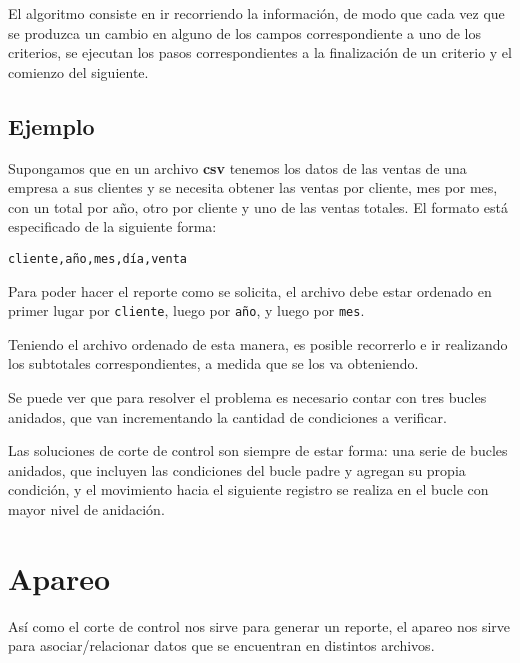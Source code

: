 El algoritmo consiste en ir recorriendo la información, de modo que cada vez
que se produzca un cambio en alguno de los campos correspondiente a uno de los
criterios, se ejecutan los pasos correspondientes a la finalización de un
criterio y el comienzo del siguiente.

\subsection*{Ejemplo}

Supongamos que en un archivo \textbf{csv} tenemos los datos de las ventas de
una empresa a sus clientes y se necesita obtener las ventas por cliente,
mes por mes, con un total por año, otro por cliente y uno de las ventas 
totales. El formato está especificado de la siguiente forma:

\begin{verbatim}
cliente,año,mes,día,venta
\end{verbatim}

Para poder hacer el reporte como se solicita, el archivo debe estar ordenado en
primer lugar por \verb!cliente!, luego por \verb!año!, y luego por \verb!mes!.

Teniendo el archivo ordenado de esta manera, es posible recorrerlo e ir
realizando los subtotales correspondientes, a medida que se los va
obteniendo.



Se puede ver que para resolver el problema es necesario contar con tres
bucles anidados, que van incrementando la cantidad de condiciones a
verificar.

\begin{observacion}
Las soluciones de corte de control son siempre de estar forma: una serie de
bucles anidados, que incluyen las condiciones del bucle padre y agregan su
propia condición, y el movimiento hacia el siguiente registro se realiza en
el bucle con mayor nivel de anidación.
\end{observacion}

\section{Apareo}

Así como el corte de control nos sirve para generar un reporte, el apareo nos
sirve para asociar/relacionar datos que se encuentran en distintos archivos.

